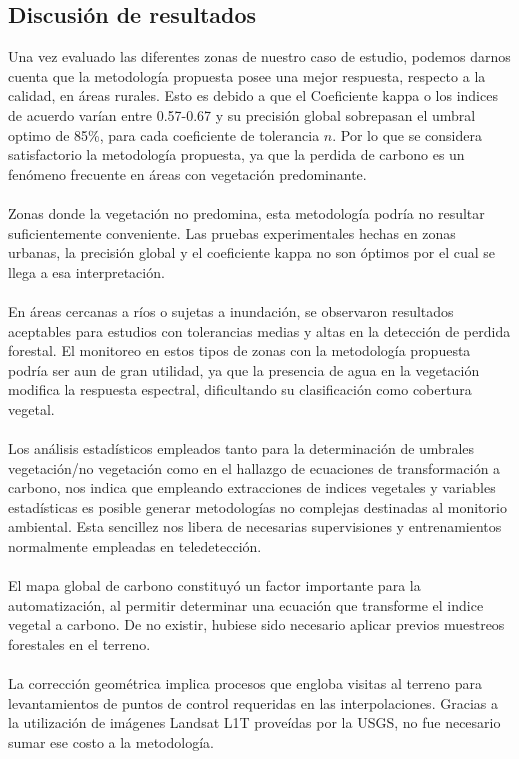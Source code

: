 \subsection{Discusi\'on de resultados}
Una vez evaluado las diferentes zonas de nuestro caso de estudio, podemos darnos cuenta que la metodolog\'ia propuesta posee una mejor respuesta, respecto a la calidad, en \'areas rurales. Esto es debido a que el Coeficiente kappa o los indices de acuerdo var\'ian entre 0.57-0.67 y su precisi\'on global sobrepasan el umbral optimo de 85\%, para cada coeficiente de tolerancia $ n $. Por lo que se considera satisfactorio la metodolog\'ia propuesta, ya que la perdida de carbono es un fen\'omeno frecuente en \'areas con vegetaci\'on predominante.\\~\\	
Zonas donde la vegetaci\'on no predomina, esta metodolog\'ia podr\'ia no resultar suficientemente conveniente. Las pruebas experimentales hechas en zonas urbanas, la precisi\'on global y el coeficiente kappa no son \'optimos por el cual se llega a esa interpretaci\'on.\\~\\
 En \'areas cercanas a r\'ios o sujetas a inundaci\'on, se observaron resultados aceptables para  estudios con tolerancias medias y altas en la detecci\'on de perdida forestal. El monitoreo en estos tipos de zonas con la metodolog\'ia propuesta podr\'ia ser aun de gran utilidad, ya que la presencia de agua en la vegetaci\'on modifica la respuesta espectral, dificultando su clasificaci\'on como cobertura vegetal.\\~\\	
 Los an\'alisis estad\'isticos empleados tanto para la determinaci\'on de umbrales vegetaci\'on/no vegetaci\'on como en el hallazgo de ecuaciones de transformaci\'on a carbono, nos indica que empleando extracciones de indices vegetales y variables estad\'isticas es posible generar metodolog\'ias no complejas destinadas al monitorio ambiental. Esta sencillez nos libera de necesarias supervisiones y entrenamientos normalmente empleadas en teledetecci\'on.\\~\\	
El mapa global de carbono \cite{saatchi2011benchmark} constituy\'o un factor importante para la automatizaci\'on, al permitir determinar una ecuaci\'on que transforme el indice vegetal a carbono. De no existir, hubiese sido necesario aplicar previos muestreos forestales en el terreno.\\~\\	
 La correcci\'on geom\'etrica implica procesos que engloba visitas al terreno para levantamientos de puntos de control requeridas en las interpolaciones. Gracias a la utilizaci\'on de im\'agenes Landsat L1T prove\'idas por la USGS, no fue necesario sumar ese costo a la metodolog\'ia.
